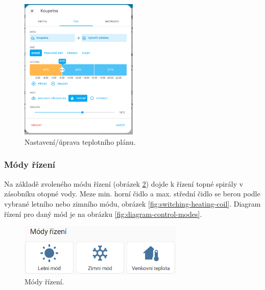 \begin{Czech}
\begin{figure}[H]
    \centering
    \includegraphics[width=0.5\textwidth]{pictures/czech/software/temperature-plan-thermostat.png}
    \caption{Nastavení/úprava teplotního plánu.}
    \label{fig:temperature-plan-thermostat}
\end{figure}
\end{Czech}


\begin{Czech}
\subsubsection{Módy řízení}
\end{Czech}
\label{sec:control-modes}

\begin{Czech}
Na základě zvoleného módu řízení (obrázek \ref{fig:control-modes}) dojde k řízení topné spirály v zásobníku otopné vody. Meze min. horní čidlo a max. střední čidlo se berou podle vybrané letního nebo zimního módu, obrázek \ref{fig:switching-heating-coil}. Diagram řízení pro daný mód je na obrázku \ref{fig:diagram-control-modes}.
\end{Czech}

\begin{Czech}
\begin{figure}[H]
    \centering
    \includegraphics[width=0.7\textwidth]{pictures/czech/software/control-modes.png}
    \caption{Módy řízení.}
    \label{fig:control-modes}
\end{figure}
\end{Czech}


